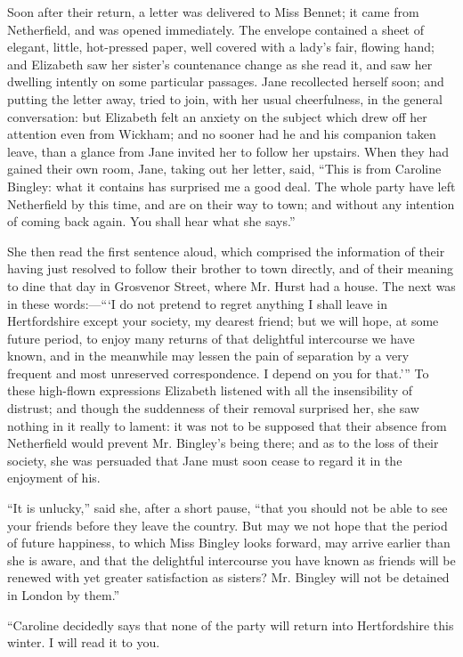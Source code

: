 \documentclass[12pt,openright]{book}
\begin{document}
Soon after their return, a letter was delivered to Miss Bennet; it came from Netherfield, and was opened immediately. The envelope contained a sheet of elegant, little, hot-pressed paper, well covered with a lady’s fair, flowing hand; and Elizabeth saw her sister’s countenance change as she read it, and saw her dwelling intently on some particular passages. Jane recollected herself soon; and putting the letter away, tried to join, with her usual cheerfulness, in the general conversation: but Elizabeth felt an anxiety on the subject which drew off her attention even from Wickham; and no sooner had he and his companion taken leave, than a glance from Jane invited her to follow her upstairs. When they had gained their own room, Jane, taking out her letter, said, “This is from Caroline Bingley: what it contains has surprised me a good deal. The whole party have left Netherfield by this time, and are on their way to town; and without any intention of coming back again. You shall hear what she says.”

She then read the first sentence aloud, which comprised the information of their having just resolved to follow their brother to town directly, and of their meaning to dine that day in Grosvenor Street, where Mr. Hurst had a house. The next was in these words:—“‘I do not pretend to regret anything I shall leave in Hertfordshire except your society, my dearest friend; but we will hope, at some future period, to enjoy many returns of that delightful intercourse we have known, and in the meanwhile may lessen the pain of separation by a very frequent and most unreserved correspondence. I depend on you for that.’” To these high-flown expressions Elizabeth listened with all the insensibility of distrust; and though the suddenness of their removal surprised her, she saw nothing in it really to lament: it was not to be supposed that their absence from Netherfield would prevent Mr. Bingley’s being there; and as to the loss of their society, she was persuaded that Jane must soon cease to regard it in the enjoyment of his.

“It is unlucky,” said she, after a short pause, “that you should not be able to see your friends before they leave the country. But may we not hope that the period of future happiness, to which Miss Bingley looks forward, may arrive earlier than she is aware, and that the delightful intercourse you have known as friends will be renewed with yet greater satisfaction as sisters? Mr. Bingley will not be detained in London by them.”

“Caroline decidedly says that none of the party will return into Hertfordshire this winter. I will read it to you.
\end{document}
